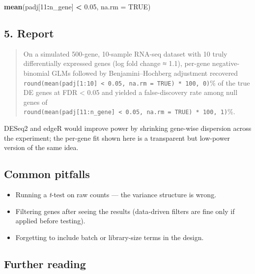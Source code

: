 \documentclass[
]{article}
\newenvironment{Shaded}{\begin{snugshade}}{\end{snugshade}}
\newcommand{\AttributeTok}[1]{\textcolor[rgb]{0.13,0.29,0.53}{#1}}
\newcommand{\ConstantTok}[1]{\textcolor[rgb]{0.56,0.35,0.01}{#1}}
\newcommand{\DecValTok}[1]{\textcolor[rgb]{0.00,0.00,0.81}{#1}}
\newcommand{\FloatTok}[1]{\textcolor[rgb]{0.00,0.00,0.81}{#1}}
\newcommand{\FunctionTok}[1]{\textcolor[rgb]{0.13,0.29,0.53}{\textbf{#1}}}
\newcommand{\NormalTok}[1]{#1}
\newcommand{\SpecialCharTok}[1]{\textcolor[rgb]{0.81,0.36,0.00}{\textbf{#1}}}
\providecommand{\tightlist}{%
  \setlength{\itemsep}{0pt}\setlength{\parskip}{0pt}}
\begin{document}
\begin{Shaded}
\begin{Highlighting}[]
\FunctionTok{mean}\NormalTok{(padj[}\DecValTok{11}\SpecialCharTok{:}\NormalTok{n\_gene] }\SpecialCharTok{\textless{}} \FloatTok{0.05}\NormalTok{, }\AttributeTok{na.rm =} \ConstantTok{TRUE}\NormalTok{)}
\end{Highlighting}
\end{Shaded}

\subsection{5. Report}\label{report}

\begin{quote}
On a simulated 500-gene, 10-sample RNA-seq dataset with 10 truly
differentially expressed genes (log fold change ≈ 1.1), per-gene
negative-binomial GLMs followed by Benjamini--Hochberg adjustment
recovered
\texttt{round(mean(padj{[}1:10{]}\ \textless{}\ 0.05,\ na.rm\ =\ TRUE)\ *\ 100,\ 0)}\%
of the true DE genes at FDR \textless{} 0.05 and yielded a
false-discovery rate among null genes of
\texttt{round(mean(padj{[}11:n\_gene{]}\ \textless{}\ 0.05,\ na.rm\ =\ TRUE)\ *\ 100,\ 1)}\%.
\end{quote}

DESeq2 and edgeR would improve power by shrinking gene-wise dispersion
across the experiment; the per-gene fit shown here is a transparent but
low-power version of the same idea.

\subsection{Common pitfalls}\label{common-pitfalls}

\begin{itemize}
\tightlist
\item
  Running a \emph{t}-test on raw counts --- the variance structure is
  wrong.
\item
  Filtering genes after seeing the results (data-driven filters are fine
  only if applied before testing).
\item
  Forgetting to include batch or library-size terms in the design.
\end{itemize}

\subsection{Further reading}\label{further-reading}
\end{document}
